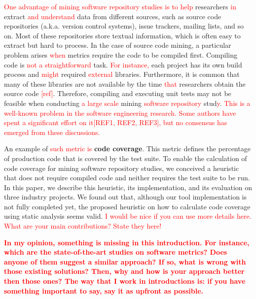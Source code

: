 \documentclass{sig-alternate}
\begin{document}


\textcolor{red}{One advantage of mining software repository studies is to help } researchers \textcolor{red}{in} extract \textcolor{red}{and understand} data from  different sources, 
such as source code repositories (a.k.a. version control systems), 
issue trackers, mailing lists, and so on. Most of these repositories 
store textual information, which is often easy to extract but hard to process. 
In the case of source code mining, a particular problem arises \textcolor{red}{when}  metrics 
require the code to be compiled first.  Compiling code is \textcolor{red}{not a straightforward}  task. \textcolor{red}{For instance,} 
each project has its own build process and \textcolor{red}{might} required \textcolor{red}{external} libraries. Furthermore, 
it is common that many of these libraries are not available by the time \textcolor{red}{that} 
researchers obtain the source code \textcolor{red}{[ref]}. Therefore, compiling and executing 
unit tests may not be feasible when conducting \textcolor{red}{a large scale} mining \textcolor{red}{software repository} stud\textcolor{red}{y}.  \textcolor{red}{This is a well-known problem in the software engineering research. Some authors have spent a significant effort on it[REF1, REF2, REF3], but no consensus has emerged from these discussions.}

An example of \textcolor{red}{such metric is}  \textbf{code coverage}. 
This metric defines the percentage of production code that is covered 
by the test suite. To enable the calculation of code coverage for mining software
repository studies, we conceived a heuristic that does not require compiled code
and neither requires the test suite to be run. In this paper, we describe this heuristic,
its implementation, and its evaluation on three industry projects. 
We found out that, although our tool implementation is not fully completed yet, the 
proposed heuristic on how to calculate code coverage using static analysis seems valid. \textcolor{red}{I would be nice if you can use more details here. What are your main contributions? State they here!}


\textcolor{red}{\textbf{In my opinion, something is missing in this introduction. For instance, which are the state-of-the-art studies on software metrics? Does anyone of them suggest a similar approach? If so, what is wrong with those existing solutions? Then, why and how is your approach better then those ones? The way that I work in introductions is: if you have something important to say, say it as upfront as possible.}}
\end{document}
